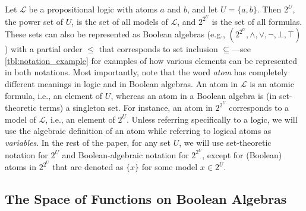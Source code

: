 \documentclass[letterpaper]{article} %
\theoremstyle{definition}
\theoremstyle{remark}
\begin{document}
Let $\mathcal{L}$ be a propositional logic with atoms $a$ and $b$, and let $U =
\{ a, b \}$. Then $2^U$, the power set of $U$, is the set of all models of
$\mathcal{L}$, and $2^{2^U}$ is the set of all formulas. These sets can also be
represented as Boolean algebras (e.g., $(2^{2^U}, \land, \lor, \neg, \bot,
\top)$) with a partial order $\le$ that corresponds to set inclusion
$\subseteq$---see \cref{tbl:notation_example} for examples of how various
elements can be represented in both notations. Most importantly, note that the
word \emph{atom} has completely different meanings in logic and in Boolean
algebras. An atom in $\mathcal{L}$ is an atomic formula, i.e., an element of
$U$, whereas an atom in a Boolean algebra is (in set-theoretic terms) a
singleton set. For instance, an atom in $2^{2^U}$ corresponds to a model of
$\mathcal{L}$, i.e., an element of $2^U$. Unless referring specifically to a
logic, we will use the algebraic definition of an atom while referring to
logical atoms as \emph{variables}. In the rest of the paper, for any set $U$, we
will use set-theoretic notation for $2^U$ and Boolean-algebraic notation for
$2^{2^U}$, except for (Boolean) atoms in $2^{2^U}$ that are denoted as $\{x\}$
for some model $x \in 2^U$.

\subsection{The Space of Functions on Boolean Algebras}
\end{document}
